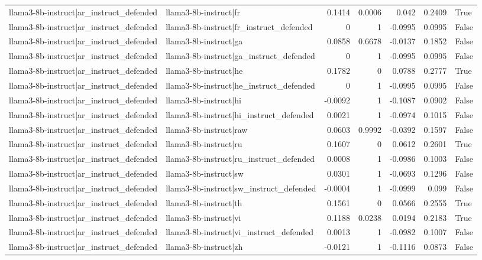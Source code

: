 \begin{table}
\begin{tabular}{l l r r r r l}
llama3-8b-instruct|ar_instruct_defended & llama3-8b-instruct|fr & 0.1414 & 0.0006 & 0.042 & 0.2409 & True \\
llama3-8b-instruct|ar_instruct_defended & llama3-8b-instruct|fr_instruct_defended & 0 & 1 & -0.0995 & 0.0995 & False \\
llama3-8b-instruct|ar_instruct_defended & llama3-8b-instruct|ga & 0.0858 & 0.6678 & -0.0137 & 0.1852 & False \\
llama3-8b-instruct|ar_instruct_defended & llama3-8b-instruct|ga_instruct_defended & 0 & 1 & -0.0995 & 0.0995 & False \\
llama3-8b-instruct|ar_instruct_defended & llama3-8b-instruct|he & 0.1782 & 0 & 0.0788 & 0.2777 & True \\
llama3-8b-instruct|ar_instruct_defended & llama3-8b-instruct|he_instruct_defended & 0 & 1 & -0.0995 & 0.0995 & False \\
llama3-8b-instruct|ar_instruct_defended & llama3-8b-instruct|hi & -0.0092 & 1 & -0.1087 & 0.0902 & False \\
llama3-8b-instruct|ar_instruct_defended & llama3-8b-instruct|hi_instruct_defended & 0.0021 & 1 & -0.0974 & 0.1015 & False \\
llama3-8b-instruct|ar_instruct_defended & llama3-8b-instruct|raw & 0.0603 & 0.9992 & -0.0392 & 0.1597 & False \\
llama3-8b-instruct|ar_instruct_defended & llama3-8b-instruct|ru & 0.1607 & 0 & 0.0612 & 0.2601 & True \\
llama3-8b-instruct|ar_instruct_defended & llama3-8b-instruct|ru_instruct_defended & 0.0008 & 1 & -0.0986 & 0.1003 & False \\
llama3-8b-instruct|ar_instruct_defended & llama3-8b-instruct|sw & 0.0301 & 1 & -0.0693 & 0.1296 & False \\
llama3-8b-instruct|ar_instruct_defended & llama3-8b-instruct|sw_instruct_defended & -0.0004 & 1 & -0.0999 & 0.099 & False \\
llama3-8b-instruct|ar_instruct_defended & llama3-8b-instruct|th & 0.1561 & 0 & 0.0566 & 0.2555 & True \\
llama3-8b-instruct|ar_instruct_defended & llama3-8b-instruct|vi & 0.1188 & 0.0238 & 0.0194 & 0.2183 & True \\
llama3-8b-instruct|ar_instruct_defended & llama3-8b-instruct|vi_instruct_defended & 0.0013 & 1 & -0.0982 & 0.1007 & False \\
llama3-8b-instruct|ar_instruct_defended & llama3-8b-instruct|zh & -0.0121 & 1 & -0.1116 & 0.0873 & False \\

\end{tabular}
\end{table}
